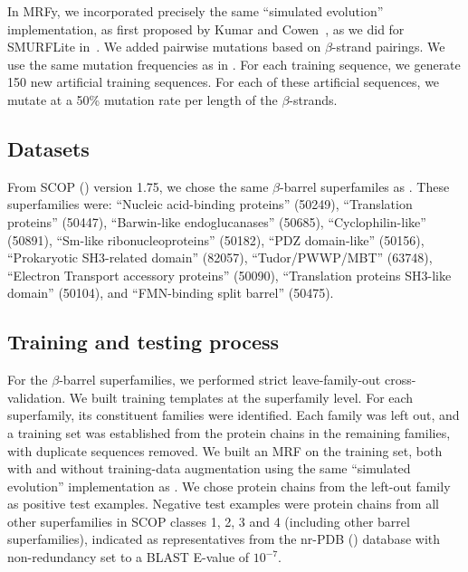 \documentclass[blockstyle,times,preprint]{sigplanconf}
\begin{document}
In MRFy, we incorporated precisely the same ``simulated evolution'' 
implementation, as first proposed by Kumar and 
Cowen~\cite{Kumar:2009tp, Kumar:2010wv}, as we did for SMURFLite
in~\cite{Daniels:2012dg}.
We added pairwise mutations based on $\beta$-strand pairings.
We use the same mutation frequencies as in \citet{Daniels:2012dg}.
For each training sequence, we generate 150 new artificial training 
sequences. 
For each of these artificial sequences, we mutate at a 50\% mutation rate per 
length of the $\beta$-strands.

\subsection{Datasets} \label{mrfy-datasets}

From SCOP (\cite{Murzin:1995uh}) version 1.75, we chose the same
$\beta$-barrel superfamiles as \citet{Daniels:2012dg}.
These superfamilies were: ``Nucleic acid-binding proteins'' (50249), 
``Translation proteins'' (50447), 
``Barwin-like endoglucanases'' (50685), ``Cyclophilin-like'' (50891), ``Sm-like 
ribonucleoproteins'' (50182), ``PDZ domain-like'' (50156), ``Prokaryotic 
SH3-related domain'' (82057), ``Tudor/PWWP/MBT'' (63748), ``Electron Transport 
accessory proteins'' (50090), ``Translation proteins SH3-like domain'' (50104), 
and ``FMN-binding split barrel'' (50475). 

\subsection{Training and testing process} \label{mrfy-training}

For the $\beta$-barrel superfamilies, we performed strict leave-family-out 
cross-validation. 
We built training templates at the superfamily level. 
For each superfamily, its constituent families were identified. 
Each family was left out, and a training set was established from the protein 
chains in the remaining families, with duplicate sequences removed. 
We built an MRF on the training set, both with and without training-data
augmentation using the same ``simulated evolution'' implementation as 
\citet{Daniels:2012dg}.
We chose protein chains from the left-out family as positive test examples. 
Negative test examples were protein chains from all other superfamilies in SCOP 
classes 1, 2, 3 and 4 (including other barrel superfamilies), indicated as 
representatives from the nr-PDB (\cite{Berman:2000hl}) database with 
non-redundancy set to a BLAST E-value of $10^{-7}$.
\end{document}
